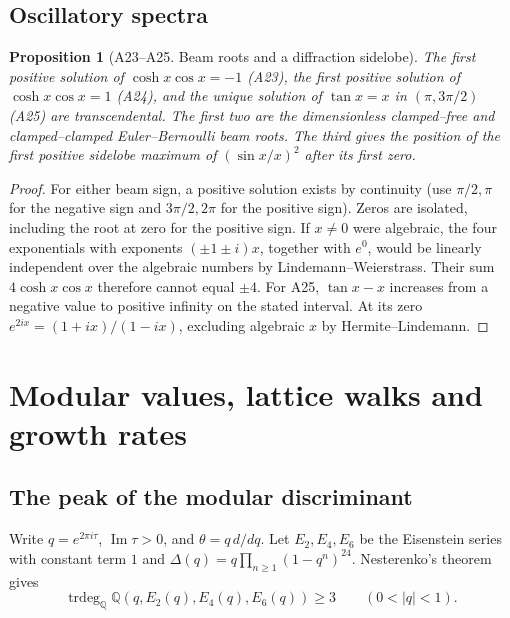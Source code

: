 \documentclass[11pt,a4paper]{article}
\newtheorem{proposition}[theorem]{Proposition}
\theoremstyle{definition}
\theoremstyle{remark}
\begin{document}
\subsection{Oscillatory spectra}
\par\hypertarget{cat-A23}{}\label{page:A23}\hypertarget{cat-A24}{}\label{page:A24}\hypertarget{cat-A25}{}\label{page:A25}
\begin{proposition}[A23--A25. Beam roots and a diffraction sidelobe]
The first positive solution of $\cosh x\cos x=-1$ (A23), the first
positive solution of $\cosh x\cos x=1$ (A24), and the unique solution
of $\tan x=x$ in $(\pi,3\pi/2)$ (A25) are transcendental.
The first two are the dimensionless clamped--free and clamped--clamped
Euler--Bernoulli beam roots. The third gives the position of the first
positive sidelobe maximum of $(\sin x/x)^2$ after its first zero.
\end{proposition}
\begin{proof}
For either beam sign, a positive solution exists by continuity (use
$\pi/2,\pi$ for the negative sign and $3\pi/2,2\pi$ for the positive
sign). Zeros are isolated, including the root at zero for the positive
sign. If $x\ne0$ were algebraic, the four exponentials with exponents
$(\pm1\pm i)x$, together with $e^0$, would be linearly independent
over the algebraic numbers by Lindemann--Weierstrass. Their sum
$4\cosh x\cos x$ therefore cannot equal $\pm4$.
For A25, $\tan x-x$ increases from a negative value to positive infinity
on the stated interval. At its zero $e^{2ix}=(1+ix)/(1-ix)$, excluding
algebraic $x$ by Hermite--Lindemann.
\end{proof}


\section{Modular values, lattice walks and growth rates}\label{sec:mcat}

\subsection{The peak of the modular discriminant}

Write $q=e^{2\pi i\tau}$, $\operatorname{Im}\tau>0$, and $\theta=q\,d/dq$.
Let $E_2,E_4,E_6$ be the Eisenstein series with constant term $1$ and
$\Delta(q)=q\prod_{n\ge1}(1-q^n)^{24}$.
Nesterenko's theorem \cite{aNest} gives
\[
 \operatorname{trdeg}_{\mathbb Q}\mathbb Q(q,E_2(q),E_4(q),E_6(q))\ge3
 \qquad(0<|q|<1).
\]
\end{document}
